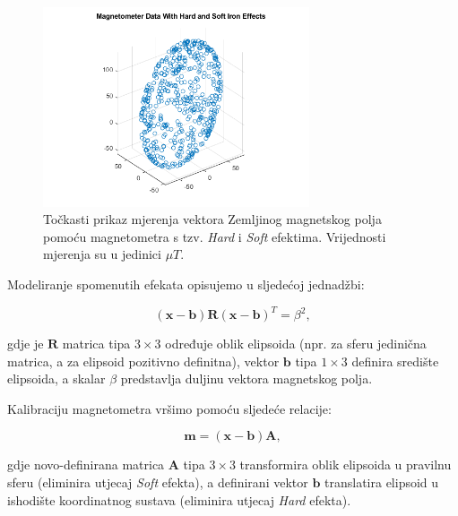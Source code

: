 \documentclass[times, utf8, diplomski, numeric]{templates/template}
\begin{document}
{{{{                \begin{figure}[htb]
                \centering
                \includegraphics[width=0.7\textwidth]{images/mag_hard_soft.png}
                \caption{Točkasti prikaz mjerenja vektora Zemljinog magnetskog polja pomoću magnetometra s tzv. \emph{Hard} i \emph{Soft} efektima. Vrijednosti mjerenja su u jedinici $\mu T$.}
                \label{fig:mag_hard_soft}
                \end{figure}

                Modeliranje spomenutih efekata opisujemo u sljedećoj jednadžbi:

                \begin{equation}
                    (\boldsymbol{x} - \boldsymbol{b}) \boldsymbol{R} (\boldsymbol{x} - \boldsymbol{b})^T = \beta^2,
                \end{equation}

                gdje je $\boldsymbol{R}$ matrica tipa $3\times3$ određuje oblik elipsoida (npr. za sferu jedinična matrica, a za elipsoid pozitivno definitna), vektor $\boldsymbol{b}$ tipa $1\times3$ definira središte elipsoida, a skalar $\beta$ predstavlja duljinu vektora magnetskog polja. 

                Kalibraciju magnetometra vršimo pomoću sljedeće relacije:

                \begin{equation}
                    \boldsymbol{m} = (\boldsymbol{x} - \boldsymbol{b}) \boldsymbol{A},
                \end{equation}

                gdje novo-definirana matrica $\boldsymbol{A}$ tipa $3\times3$ transformira oblik elipsoida u pravilnu sferu (eliminira utjecaj \emph{Soft} efekta), a definirani vektor $\boldsymbol{b}$ translatira elipsoid u ishodište koordinatnog sustava (eliminira utjecaj \emph{Hard} efekta).

}}}}
\end{document}
